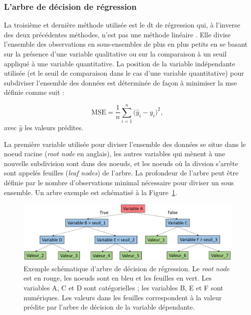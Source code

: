 \subsubsection{L'arbre de décision de régression}

La troisième et dernière méthode utilisée est le \gls{dt} de régression qui, à l'inverse des deux précédentes méthodes, n'est pas une méthode 
linéaire \citep{Quinlan1986}. Elle divise l'ensemble des observations en sous-ensembles de plus en plus petits en se basant sur la présence 
d'une variable qualitative ou sur la comparaison à un seuil appliqué à une variable quantitative. La position de la variable indépendante utilisée (et le
seuil de comparaison dans le cas d'une variable quantitative) pour subdiviser l'ensemble des données est déterminée de façon à minimiser la
\gls{mse} définie comme suit :

\begin{equation}
\label{eq:factors_decision_tree_mse}
\text{MSE} = \frac{1}{n}\sum_{i=1}^{n} \Big(\hat{y}_i - {y}_i\Big)^2,
\end{equation}
avec $\hat{y}$ les valeurs prédites.

La première variable utilisée pour diviser l'ensemble des données se situe dans le noeud racine (\textit{root node} en anglais), les autres
variables qui mènent à une nouvelle subdivision sont dans des noeuds, et les noeuds où la divsion s'arrête sont appelés
feuilles (\textit{leaf nodes}) de l'arbre. La profondeur de l'arbre peut être définie par le nombre d'observations minimal nécessaire
pour diviser un sous ensemble. Un arbre exemple est schématisé à la Figure~\ref{Figure:factors_decision_tree_example}.

\begin{figure}[h!]
  \centering
	\includegraphics[width=1.0\linewidth]{figures/chapter-3/decision-tree-example} 
  \caption{Exemple schématique d'arbre de décision de régression. Le \textit{root node} est en rouge, les noeuds sont en bleu et les feuilles en vert. 
	Les variables A, C et D sont catégorielles ; les variables B, E et F sont numériques. Les valeurs dans les feuilles correspondent à la valeur 
	prédite par l'arbre de décision de la variable dépendante.}
  \label{Figure:factors_decision_tree_example}
\end{figure}

